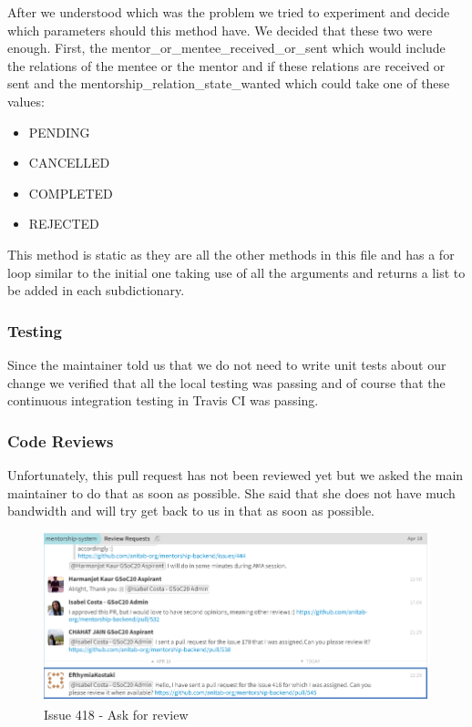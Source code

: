 \documentclass{article}
\begin{document}
After we understood which was the problem we tried to experiment and decide which parameters should this method have. We decided that these two were enough. First, the mentor\_or\_mentee\_received\_or\_sent which would include the relations of the mentee or the mentor and if these relations are received or sent and the mentorship\_relation\_state\_wanted which could take one of these values:
\begin{itemize}
  \item PENDING
  \item CANCELLED
  \item COMPLETED
  \item REJECTED
\end{itemize}

\hspace{0.5cm}This method is static as they are all the other methods in this file and has a for loop similar to the initial one taking use of all the arguments and returns a list to be added in each subdictionary.
\subsubsection{Testing}
\hspace{0.5cm}Since the maintainer told us that we do not need to write unit tests about our change we verified that all the local testing was passing and of course that the continuous integration testing in Travis CI was passing.
\subsubsection{Code Reviews}
\hspace{0.5cm}Unfortunately, this pull request has not been reviewed yet but we asked the main maintainer to do that as soon as possible. She said that she does not have much bandwidth and will try get back to us in that as soon as possible.

\begin{figure}[tph!]
\centerline{\includegraphics[totalheight=7cm, width=15cm]{issue418-ask-for-review.png}}
    \caption{Issue 418 - Ask for review}
    \label{fig:verticalcell}
\end{figure}
\vfill
\clearpage
\end{document}
